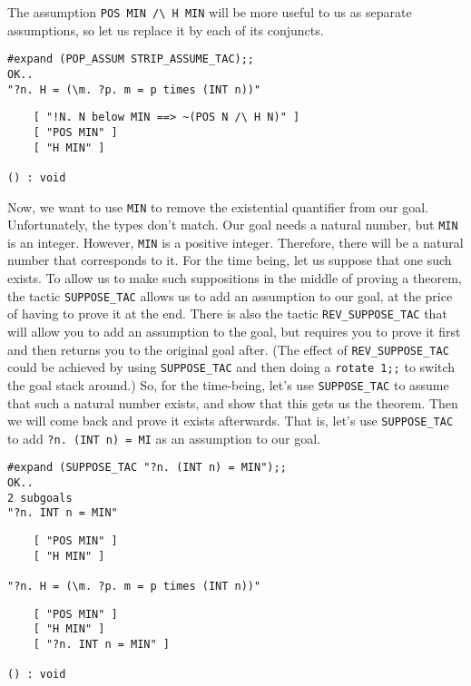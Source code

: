 The assumption {\small\verb+POS MIN /\ H MIN+} will be more useful to
us as separate assumptions, so let us replace it by each of its conjuncts.
\begin{session}
\begin{verbatim}
#expand (POP_ASSUM STRIP_ASSUME_TAC);;
OK..
"?n. H = (\m. ?p. m = p times (INT n))"
\end{verbatim}
\mvdots
\begin{verbatim}
    [ "!N. N below MIN ==> ~(POS N /\ H N)" ]
    [ "POS MIN" ]
    [ "H MIN" ]

() : void
\end{verbatim}
\end{session}

Now, we want to use {\small\verb+MIN+} to remove the existential
quantifier from our goal.  Unfortunately, the types don't match.  Our
goal needs a natural number, but {\small\verb+MIN+} is an integer.
However, {\small\verb+MIN+} is a positive integer.  Therefore, there
will be a natural number that corresponds to it.  For the time being,
let us suppose that one such exists.  To allow us to make such
suppositions in the middle of proving a theorem, the tactic
{\small\verb+SUPPOSE_TAC+} allows us to add an assumption to our goal,
at the price of having to prove it at the end.  There is also the
tactic {\small\verb+REV_SUPPOSE_TAC+} that will allow you to add an
assumption to the goal, but requires you to prove it first and then
returns you to the original goal after.  (The effect of 
{\small\verb+REV_SUPPOSE_TAC+} could be achieved by using
{\small\verb+SUPPOSE_TAC+} and then doing a {\small\verb+rotate 1;;+}
to switch the goal stack around.)  So, for the time-being, let's use
{\small\verb+SUPPOSE_TAC+} to assume that such a natural number
exists, and show that this gets us the theorem.  Then we will come
back and prove it exists afterwards.  That is, let's use
{\small\verb+SUPPOSE_TAC+} to add {\small\verb+?n. (INT n) = MI+}
as an assumption to our goal.
\begin{session}
\begin{verbatim}
#expand (SUPPOSE_TAC "?n. (INT n) = MIN");;
OK..
2 subgoals
"?n. INT n = MIN"
\end{verbatim}
\mvdots
\begin{verbatim}
    [ "POS MIN" ]
    [ "H MIN" ]

"?n. H = (\m. ?p. m = p times (INT n))"
\end{verbatim}
\mvdots
\begin{verbatim}
    [ "POS MIN" ]
    [ "H MIN" ]
    [ "?n. INT n = MIN" ]

() : void
\end{verbatim}
\end{session}

